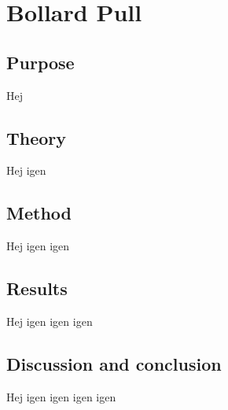 \chapter{Bollard Pull}
\label{app:bollpull}

\section{Purpose}
Hej

\section{Theory}
Hej igen

\section{Method}
Hej igen igen

\section{Results}
Hej igen igen igen

\section{Discussion and conclusion}
Hej igen igen igen igen
